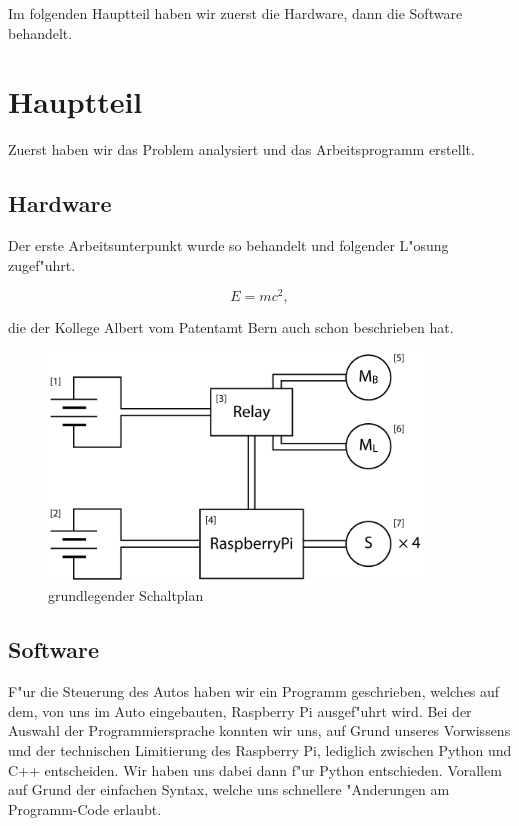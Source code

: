 \documentclass[a4paper,12pt]{article}
\begin{document}
Im folgenden Hauptteil haben wir zuerst die Hardware, dann die Software behandelt.

\section{Hauptteil}\label{sec2}

Zuerst haben wir das Problem analysiert und das Arbeitsprogramm erstellt.

\subsection{Hardware}\label{sec2.1}

Der erste Arbeitsunterpunkt wurde so behandelt und folgender L"osung zugef"uhrt.

\begin{equation}
	E = mc^2 ,
\end{equation}

die der Kollege Albert vom Patentamt Bern \cite{ModMyPi} auch schon beschrieben hat.

\begin{figure}[h]
	\centering
	\includegraphics[width=10cm]{./media/circuit_general.png}
	\caption{grundlegender Schaltplan}
	\label{Fig2}
\end{figure}

\subsection{Software}\label{sec2.2}

F"ur die Steuerung des Autos haben wir ein Programm geschrieben, welches auf dem, von uns im Auto eingebauten, Raspberry Pi ausgef"uhrt wird.
Bei der Auswahl der Programmiersprache konnten wir uns, auf Grund unseres Vorwissens und der technischen Limitierung des Raspberry Pi, lediglich zwischen Python und C++ entscheiden. Wir haben uns dabei dann f"ur Python entschieden.
Vorallem auf Grund der einfachen Syntax, welche uns schnellere "Anderungen am Programm-Code erlaubt.
\end{document}
